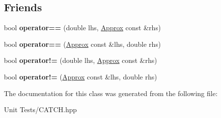 \subsection*{Friends}
\begin{DoxyCompactItemize}
\item 
bool {\bfseries operator==} (double lhs, \hyperlink{classCatch_1_1Detail_1_1Approx}{Approx} const \&rhs)\hypertarget{classCatch_1_1Detail_1_1Approx_ac766f044f1c63f0c5997982baefd9049}{}\label{classCatch_1_1Detail_1_1Approx_ac766f044f1c63f0c5997982baefd9049}

\item 
bool {\bfseries operator==} (\hyperlink{classCatch_1_1Detail_1_1Approx}{Approx} const \&lhs, double rhs)\hypertarget{classCatch_1_1Detail_1_1Approx_a35999631e6cef569f9da9f3fa910db22}{}\label{classCatch_1_1Detail_1_1Approx_a35999631e6cef569f9da9f3fa910db22}

\item 
bool {\bfseries operator!=} (double lhs, \hyperlink{classCatch_1_1Detail_1_1Approx}{Approx} const \&rhs)\hypertarget{classCatch_1_1Detail_1_1Approx_a83b3763569a7ecc143c335b630be0e47}{}\label{classCatch_1_1Detail_1_1Approx_a83b3763569a7ecc143c335b630be0e47}

\item 
bool {\bfseries operator!=} (\hyperlink{classCatch_1_1Detail_1_1Approx}{Approx} const \&lhs, double rhs)\hypertarget{classCatch_1_1Detail_1_1Approx_a7497ef839f8026cc0edd6269a80f3e09}{}\label{classCatch_1_1Detail_1_1Approx_a7497ef839f8026cc0edd6269a80f3e09}

\end{DoxyCompactItemize}


The documentation for this class was generated from the following file\+:\begin{DoxyCompactItemize}
\item 
Unit Tests/C\+A\+T\+C\+H.\+hpp\end{DoxyCompactItemize}
